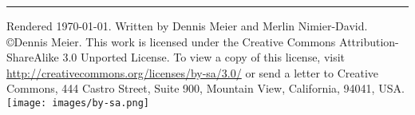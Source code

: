\documentclass[10pt,a4paper,landscape]{article}
\begin{document}
\begin{multicols*}{4}
\hrule
\tiny
Rendered \today. Written by Dennis Meier and Merlin Nimier-David.
\copyright Dennis Meier. This work is licensed under the Creative Commons Attribution-ShareAlike 3.0 Unported License.
To view a copy of this license, visit \href{http://creativecommons.org/licenses/by-sa/3.0/}{http://creativecommons.org/licenses/by-sa/3.0/} or
send a letter to Creative Commons, 444 Castro Street, Suite 900, Mountain View, California, 94041, USA.
\texttt{[image: images/by-sa.png]}

\end{multicols*}
\end{document}
